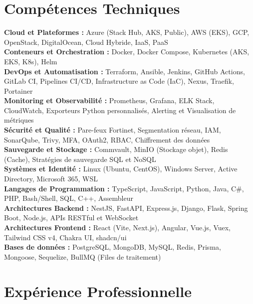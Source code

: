 \documentclass[10pt, letterpaper]{article}
\begin{document}
\section{Compétences Techniques}
\textbf{Cloud et Plateformes :} Azure (Stack Hub, AKS, Public), AWS (EKS), GCP, OpenStack, DigitalOcean, Cloud Hybride, IaaS, PaaS \\
\textbf{Conteneurs et Orchestration :} Docker, Docker Compose, Kubernetes (AKS, EKS, K8s), Helm \\
\textbf{DevOps et Automatisation :} Terraform, Ansible, Jenkins, GitHub Actions, GitLab CI, Pipelines CI/CD, Infrastructure as Code (IaC), Nexus, Traefik, Portainer \\
\textbf{Monitoring et Observabilité :} Prometheus, Grafana, ELK Stack, CloudWatch, Exporteurs Python personnalisés, Alerting et Visualisation de métriques \\
\textbf{Sécurité et Qualité :} Pare-feux Fortinet, Segmentation réseau, IAM, SonarQube, Trivy, MFA, OAuth2, RBAC, Chiffrement des données \\
\textbf{Sauvegarde et Stockage :} Commvault, MinIO (Stockage objet), Redis (Cache), Stratégies de sauvegarde SQL et NoSQL \\
\textbf{Systèmes et Identité :} Linux (Ubuntu, CentOS), Windows Server, Active Directory, Microsoft 365, WSL \\
\textbf{Langages de Programmation :} TypeScript, JavaScript, Python, Java, C\#, PHP, Bash/Shell, SQL, C++, Assembleur \\
\textbf{Architectures Backend :} NestJS, FastAPI, Express.js, Django, Flask, Spring Boot, Node.js, APIs RESTful et WebSocket \\
\textbf{Architectures Frontend :} React (Vite, Next.js), Angular, Vue.js, Vuex, Tailwind CSS v4, Chakra UI, shadcn/ui \\
\textbf{Bases de données :} PostgreSQL, MongoDB, MySQL, Redis, Prisma, Mongoose, Sequelize, BullMQ (Files de traitement)

\section{Expérience Professionnelle}
\end{document}
